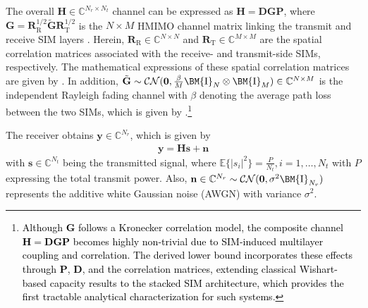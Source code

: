 \documentclass[twocolumn,10pt]{IEEEtran}
\newcommand{\mbs}[1]{\bm{#1}}
\newcommand{\mat}[1]{{\uppercase{\mbs{#1}}}}
\newcommand{\Id}{\mat{\mathrm{I}}}
\def\bD{{\mathbf{D}}}
\def\bG{{\mathbf{G}}}
\def\bH{{\mathbf{H}}}
\def\bP{{\mathbf{P}}}
\def\bR{{\mathbf{R}}}
\def\bn{{\mathbf{n}}}
\def\bs{{\mathbf{s}}}
\def\by{{\mathbf{y}}}
\def\b0{{\mathbf{0}}}
\newcommand{\EE}{\mathbb{E}}
\begin{document}
	The overall $ \bH \in \mathbb{C}^{N_{r} \times N_{t}} $ channel can be expressed as $	\bH=\bD\bG\bP$, where $
		\bG=\bR^{1/2}_{\mathrm{R}}\tilde{\bG}\bR^{1/2}_{\mathrm{T}}$ 
	is the $N\times M$ HMIMO channel matrix linking the transmit and receive SIM layers  \cite{Hu2022}. Herein,  
	$ \bR_{\mathrm{R}}\in \mathbb{C}^{N\times N} $  and $\bR_{\mathrm{T}}\in \mathbb{C}^{M\times M} $ are the spatial correlation matrices associated with the receive- and transmit-side SIMs, respectively. The mathematical expressions of these  spatial correlation matrices are given by \cite{Demir2022}.
	In addition, $ \tilde{\bG}\sim \mathcal{CN}(\b0,\frac{\beta}{M}\Id_{N}\otimes \Id_{M})\in \mathbb{C}^{N\times M} $ is the   independent  Rayleigh fading channel with   $\beta $ denoting the average path loss between the two  SIMs, which is given by \cite{Rappaport2015}.\footnote{\textcolor{black}{Although $\mathbf{G}$ follows a Kronecker correlation model, the
			composite channel $\mathbf{H}=\mathbf{D}\mathbf{G}\mathbf{P}$ becomes
			highly non-trivial due to SIM-induced multilayer coupling and correlation.
			The derived lower bound incorporates these effects through
			$\mathbf{P}$, $\mathbf{D}$, and the correlation matrices, extending
			classical Wishart-based capacity results to the stacked SIM architecture, which provides the first tractable analytical characterization for such
			systems.}}
	
	The receiver obtains $\by \in \mathbb{C}^{N_{r}}$, which is  given by 
	\begin{align}
		\by=\bH\bs +\bn
	\end{align}
	with 	$\bs \in \mathbb{C}^{N_{t}}$ being the transmitted signal, where  $\EE\{|s_{i}|^{2}\}=\frac{P}{N_t}, i=1,\ldots,N_{t}$ with $P$ expressing the  total transmit power. Also, $\bn\in \mathbb{C}^{N_{r}}\sim \mathcal{CN}(\b0, \sigma^{2}\Id_{N_{r}})$ represents the additive white Gaussian noise (AWGN) with variance $\sigma^{2} $.
	
\end{document}

